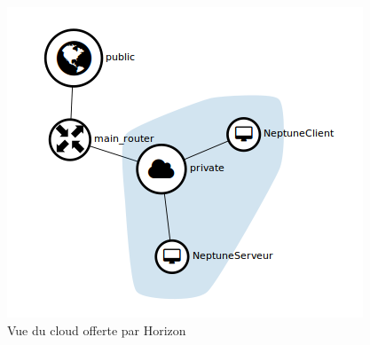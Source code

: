 \documentclass{report}
\begin{document}
    \begin{figure}[!ht]
        \centering{}\includegraphics[width=\textwidth]{network-topo.png}
        \caption{Vue du cloud offerte par Horizon}
        \label{cloudHorizon}
    \end{figure}
\end{document}
